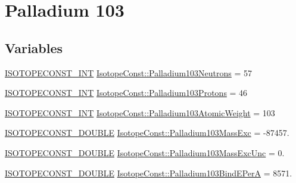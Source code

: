 \hypertarget{group___isotope_const-_palladium-_pd103}{}\section{Palladium 103}
\label{group___isotope_const-_palladium-_pd103}
\subsection*{Variables}
\begin{DoxyCompactItemize}
\item 
\mbox{\hyperlink{group___isotope_const-_macros_ga5f18360b3e99483a35c32d789e62621c}{I\+S\+O\+T\+O\+P\+E\+C\+O\+N\+S\+T\+\_\+\+I\+NT}} \mbox{\hyperlink{group___isotope_const-_palladium-_pd103_ga1262930646c466a730f81e6f581fafa9}{Isotope\+Const\+::\+Palladium103\+Neutrons}} = 57
\item 
\mbox{\hyperlink{group___isotope_const-_macros_ga5f18360b3e99483a35c32d789e62621c}{I\+S\+O\+T\+O\+P\+E\+C\+O\+N\+S\+T\+\_\+\+I\+NT}} \mbox{\hyperlink{group___isotope_const-_palladium-_pd103_gaed14eed5c07ad5328b50eba1ff53dd17}{Isotope\+Const\+::\+Palladium103\+Protons}} = 46
\item 
\mbox{\hyperlink{group___isotope_const-_macros_ga5f18360b3e99483a35c32d789e62621c}{I\+S\+O\+T\+O\+P\+E\+C\+O\+N\+S\+T\+\_\+\+I\+NT}} \mbox{\hyperlink{group___isotope_const-_palladium-_pd103_gad44790a7f8f29759b01d49cbce313425}{Isotope\+Const\+::\+Palladium103\+Atomic\+Weight}} = 103
\item 
\mbox{\hyperlink{group___isotope_const-_macros_ga8f45a7272ce02c0b4c65c44636ed719a}{I\+S\+O\+T\+O\+P\+E\+C\+O\+N\+S\+T\+\_\+\+D\+O\+U\+B\+LE}} \mbox{\hyperlink{group___isotope_const-_palladium-_pd103_gaadfae900e1c7ce5c05b25b5b94c5bb5f}{Isotope\+Const\+::\+Palladium103\+Mass\+Exc}} = -\/87457.
\item 
\mbox{\hyperlink{group___isotope_const-_macros_ga8f45a7272ce02c0b4c65c44636ed719a}{I\+S\+O\+T\+O\+P\+E\+C\+O\+N\+S\+T\+\_\+\+D\+O\+U\+B\+LE}} \mbox{\hyperlink{group___isotope_const-_palladium-_pd103_ga5643184b737ae4d053001e8063f788d3}{Isotope\+Const\+::\+Palladium103\+Mass\+Exc\+Unc}} = 0.
\item 
\mbox{\hyperlink{group___isotope_const-_macros_ga8f45a7272ce02c0b4c65c44636ed719a}{I\+S\+O\+T\+O\+P\+E\+C\+O\+N\+S\+T\+\_\+\+D\+O\+U\+B\+LE}} \mbox{\hyperlink{group___isotope_const-_palladium-_pd103_gae4a16e26afb2e2936baa187730baa2c5}{Isotope\+Const\+::\+Palladium103\+Bind\+E\+PerA}} = 8571.
\item 

\end{DoxyCompactItemize}
